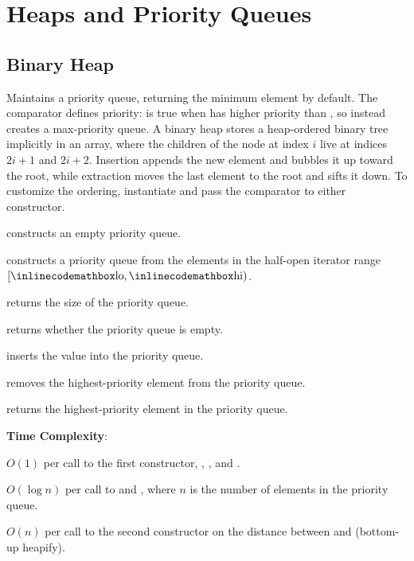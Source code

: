 \section{\texorpdfstring{Heaps and Priority Queues}{2.3 Heaps and Priority Queues}}
\setcounter{section}{3}
\setcounter{subsection}{0}
\subsection{Binary Heap}
\label{sec:2.3.1}
Maintains a priority queue, returning the minimum element by default. The comparator  defines priority:  is true when  has higher priority than , so  instead creates a max-priority queue. A binary heap stores a heap-ordered binary tree implicitly in an array, where the children of the node at index $i$ live at indices $2i + 1$ and $2i + 2$. Insertion appends the new element and bubbles it up toward the root, while extraction moves the last element to the root and sifts it down. To customize the ordering, instantiate  and pass the comparator to either constructor.

\begin{compactitem}
  \item {} constructs an empty priority queue.
  \item {} constructs a priority queue from the elements in the half-open iterator range $[{\inlinecodemath{lo}}, {\inlinecodemath{hi}})$.
  \item {} returns the size of the priority queue.
  \item {} returns whether the priority queue is empty.
  \item {} inserts the value  into the priority queue.
  \item {} removes the highest-priority element from the priority queue.
  \item {} returns the highest-priority element in the priority queue.
\end{compactitem}

\textbf{Time Complexity}:
\begin{compactitem}
  \item $O(1)$ per call to the first constructor, , , and .
  \item $O(\log n)$ per call to  and , where $n$ is the number of elements in the priority queue.
  \item $O(n)$ per call to the second constructor on the distance between  and  (bottom-up heapify).
\end{compactitem}

